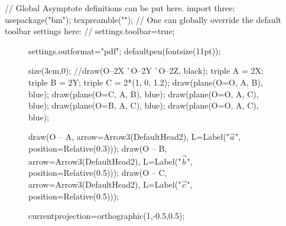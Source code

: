 \documentclass[12pt]{article}
\begin{document}
	\begin{asydef}
		// Global Asymptote definitions can be put here.
		import three;
		usepackage("bm");
		texpreamble("\def\V#1{\bm{#1}}");
		// One can globally override the default toolbar settings here:
		// settings.toolbar=true;
	\end{asydef}

	\begin{figure}
		\begin{center}
			\begin{asy}
settings.outformat="pdf";
defaultpen(fontsize(11pt));

size(3cm,0);
//draw(O--2X ^^ O--2Y ^^ O--2Z, black);
triple A = 2X;
triple B = 2Y;
triple C = 2*(1, 0, 1.2);
draw(plane(O=O, A, B), blue);
draw(plane(O=C, A, B), blue);
draw(plane(O=O, A, C), blue);
draw(plane(O=B, A, C), blue);
draw(plane(O=O, A, C), blue);

draw(O -- A, arrow=Arrow3(DefaultHead2), L=Label("$\vec a$", position=Relative(0.3)));
draw(O -- B, arrow=Arrow3(DefaultHead2), L=Label("$\vec b$", position=Relative(0.5)));
draw(O -- C, arrow=Arrow3(DefaultHead2), L=Label("$\vec c$", position=Relative(0.5)));


currentprojection=orthographic(1,-0.5,0.5);
			\end{asy}
		\end{center}
	\end{figure}
\end{document}
